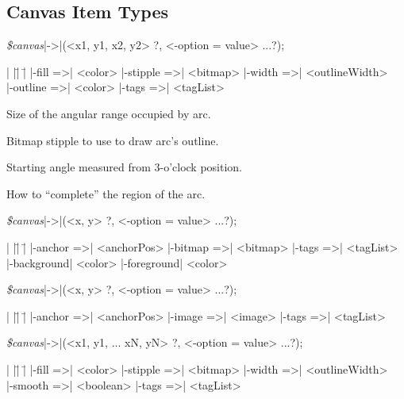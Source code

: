 
\subsection*{Canvas Item Types}

{\samepage
{\it \$canvas}|->|(<x1, y1, x2, y2> ?, <-option =\> value> ...?);
\begin{tabbing}
|                  |\=|                    |\= \kill
|-fill =>| <color>     \> |-stipple =>| <bitmap> \> |-width =>| <outlineWidth> \\
|-outline =>| <color>  \> |-tags =>| <tagList>   \> \\
\end{tabbing}
}
\vspace{-10pt}

\begin{enum}{1cm}

Size of the angular range occupied by arc.

Bitmap stipple to use to draw arc's outline.

Starting angle measured from 3-o'clock position.

How to ``complete'' the region of the arc.

\end{enum}
\vskip5pt

{\samepage

{\it \$canvas}|->|(<x, y> ?, <-option =\> value> ...?);
\begin{tabbing}
|                   |\=|                |\= \kill
|-anchor =>| <anchorPos>  \> |-bitmap =>| <bitmap>    \> |-tags =>| <tagList> \\
|-background| <color>  \> |-foreground| <color> \> \\
\end{tabbing}
}

{\samepage
{\it \$canvas}|->|(<x, y> ?, <-option =\> value> ...?);
\begin{tabbing}
|                   |\=|                |\= \kill
|-anchor =>| <anchorPos> \> |-image =>| <image> \> |-tags =>| <tagList> \\
\end{tabbing}
}

{\samepage
{\it \$canvas}|->|(<x1, y1, ... xN, yN> ?, <-option =\> value> ...?);
\begin{tabbing}
|                   |\=|                 |\= \kill
|-fill =>| <color>        \> |-stipple =>| <bitmap> \> |-width =>| <outlineWidth> \\
|-smooth =>| <boolean>    \> |-tags =>| <tagList>   \>  \\
\end{tabbing}
}
\vspace{-10pt}

